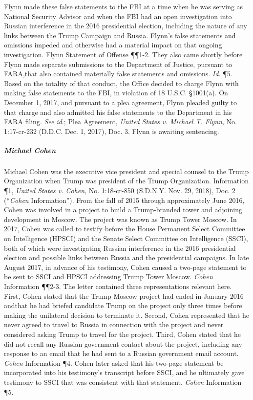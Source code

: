 Flynn made these false statements to the FBI at a time when he was serving as National Security Advisor and when the FBI had an open investigation into Russian interference in the 2016 presidential election, including the nature of any links between the Trump Campaign and Russia. 
Flynn's false statements and omissions impeded and otherwise had a material impact on that ongoing investigation. 
Flynn Statement of Offense \P\P 1-2. 
They also came shortly before Flynn made separate submissions to the Department of Justice, pursuant to FARA,that also contained materially false statements and omissions. 
\textit{Id}. \P 5. 
Based on the totality of that conduct, the Office decided to charge Flynn with making false statements to the FBI, in violation of 18 U.S.C. \S 1001(a). 
On December 1, 2017, and pursuant to a plea agreement, Flynn pleaded guilty to that charge and also admitted his false statements to the Department in his FARA filing. 
\textit{See id}.; Plea Agreement, \textit{United States v. Michael T. Flynn}, No. 1:17-cr-232 (D.D.C. Dec. 1, 2017), Doc. 3. 
Flynn is awaiting sentencing.

\subparagraph{Michael Cohen}
Michael Cohen was the executive vice president and special counsel to the Trump Organization when Trump was president of the Trump Organization. 
Information \P 1, \textit{United States v. Cohen}, No. 1:18-cr-850 (S.D.N.Y. Nov. 29, 2018), Doc. 2 (``\textit{Cohen} Information''). 
From the fall of 2015 through approximately June 2016, Cohen was involved in a project to build a Trump-branded tower and adjoining development in Moscow. 
The project was known as Trump Tower Moscow. 
In 2017, Cohen was called to testify before the House Permanent Select Committee on Intelligence (HPSCI) and the Senate Select Committee on Intelligence (SSCI), both of which were investigating Russian interference in the 2016 presidential election and possible links between Russia and the presidential campaigns. 
In late August 2017, in advance of his testimony, Cohen caused a two-page statement to be sent to SSCI and HPSCI addressing Trump Tower Moscow. 
\textit{Cohen} Information \P\P 2-3. 
The letter contained three representations relevant here. 
First, Cohen stated that the Trump Moscow project had ended in January 2016 andthat he had briefed candidate Trump on the project only three times before making the unilateral decision to terminate it. 
Second, Cohen represented that he never agreed to travel to Russia in connection with the project and never considered asking Trump to travel for the project. 
Third, Cohen stated that he did not recall any Russian government contact about the project, including any response to an email that he had sent to a Russian government email account. 
\textit{Cohen} Information \P 4. 
Cohen later asked that his two-page statement be incorporated into his testimony's transcript before SSCI, and he ultimately gave testimony to SSCI that was consistent with that statement. 
\textit{Cohen} Information \P 5.

